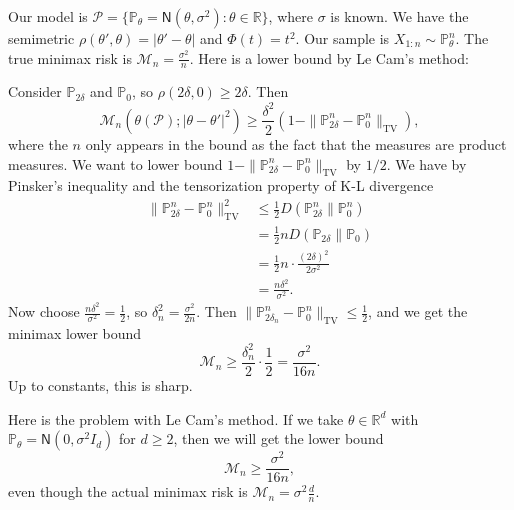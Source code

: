 \begin{exam}[Gaussian Location Family, $d=1$]
    Our model is $\mathcal{P} = \{\mathbb{P}_\theta = \mathsf{N}(\theta, \sigma^2) : \theta \in \mathbb{R}\}$, where $\sigma$ is known. We have the semimetric $\rho(\theta', \theta) = |\theta' - \theta|$ and $\Phi(t) = t^2$. Our sample is $X_{1:n} \sim \mathbb{P}_\theta^n$. The true minimax risk is $\mathcal{M}_n = \frac{\sigma^2}{n}$. Here is a lower bound by Le Cam's method:

    Consider $\mathbb{P}_{2\delta}$ and $\mathbb{P}_0$, so $\rho(2\delta, 0) \geq 2\delta$. Then
    \begin{equation*}
        \mathcal{M}_n(\theta(\mathcal{P}); |\theta - \theta'|^2) \geq \frac{\delta^2}{2}\left(1 - \|\mathbb{P}_{2\delta}^n - \mathbb{P}_0^n\|_{\mathrm{TV}}\right),
    \end{equation*}
    where the $n$ only appears in the bound as the fact that the measures are product measures. We want to lower bound $1 - \|\mathbb{P}_{2\delta}^n - \mathbb{P}_0^n\|_{\mathrm{TV}}$ by $1/2$. We have by Pinsker's inequality and the tensorization property of K-L divergence
    \begin{align*}
        \|\mathbb{P}_{2\delta}^n - \mathbb{P}_0^n\|_{\mathrm{TV}}^2
        &\leq \frac{1}{2} D(\mathbb{P}_{2\delta}^n \| \mathbb{P}_0^n) \\
        &= \frac{1}{2} n D(\mathbb{P}_{2\delta} \| \mathbb{P}_0) \\
        &= \frac{1}{2} n \cdot \frac{(2\delta)^2}{2\sigma^2} \\
        &= \frac{n\delta^2}{\sigma^2}.
    \end{align*}
    Now choose $\frac{n\delta^2}{\sigma^2} = \frac{1}{2}$, so $\delta_n^2 = \frac{\sigma^2}{2n}$. Then $\|\mathbb{P}_{2\delta_n}^n - \mathbb{P}_0^n\|_{\mathrm{TV}} \leq \frac{1}{2}$, and we get the minimax lower bound
    \begin{equation*}
        \mathcal{M}_n \geq \frac{\delta_n^2}{2} \cdot \frac{1}{2} = \frac{\sigma^2}{16n}.
    \end{equation*}
    Up to constants, this is sharp.

    Here is the problem with Le Cam's method. If we take $\theta \in \mathbb{R}^d$ with $\mathbb{P}_\theta = \mathsf{N}(0, \sigma^2 I_d)$ for $d \geq 2$, then we will get the lower bound
    \begin{equation*}
        \mathcal{M}_n \geq \frac{\sigma^2}{16n},
    \end{equation*}
    even though the actual minimax risk is $\mathcal{M}_n = \sigma^2 \frac{d}{n}$.
\end{exam}

